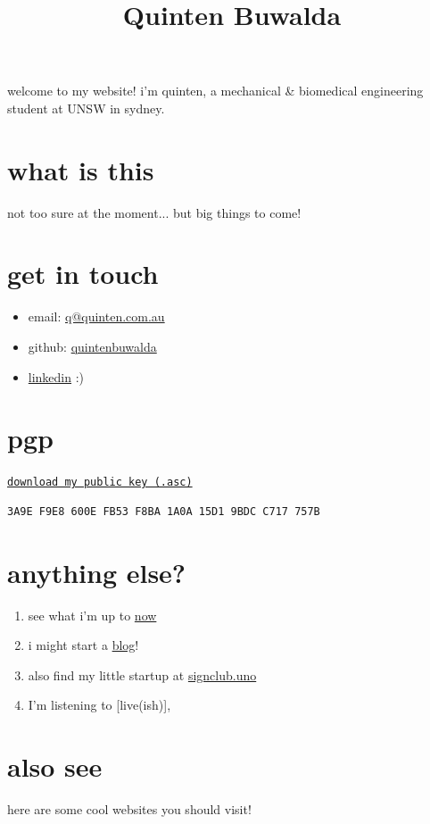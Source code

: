 \documentclass{article}
\title{Quinten Buwalda}
\author{}
\date{}
\begin{document}
\maketitle
welcome to my website! i'm quinten, a mechanical \& biomedical engineering student at UNSW in sydney.

\section{what is this}
not too sure at the moment... but big things to come!

\section{get in touch}

\begin{itemize}
    \item email: \href{mailto:q@quinten.com.au}{q@quinten.com.au}
    \item github: \href{https://github.com/quintenbuwalda}{quintenbuwalda}
    \item \href{https://www.linkedin.com/in/quintenb}{linkedin} :)
\end{itemize}

\section{pgp}
\medskip
\href{/pgp/public-key.asc}{\texttt{download my public key (.asc)}}

\begin{center}
\begin{BVerbatim}[frame=single]
3A9E F9E8 600E FB53 F8BA 1A0A 15D1 9BDC C717 757B
\end{BVerbatim}
\end{center}

\section{anything else?}

\begin{enumerate}
\item see what i'm up to \href{/now}{now}
\item i might start a \href{/blog/}{blog}!
\item also find my little startup at \href{https://signclub.uno}{signclub.uno}
\item I'm listening to [live(ish)], \ListeningHistory
\end{enumerate}


\section{also see}
here are some cool websites you should visit!


\end{document}
